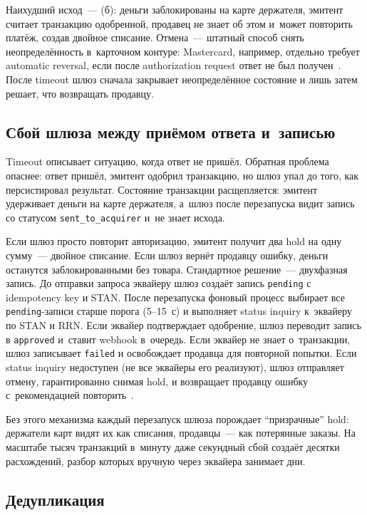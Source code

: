 Наихудший исход~--- (б): деньги заблокированы на карте
держателя, эмитент считает транзакцию одобренной, продавец
не знает об этом и~может повторить платёж, создав двойное списание.
Отмена~--- штатный способ снять неопределённость в~карточном
контуре: Mastercard, например, отдельно требует automatic reversal,
если после authorization request ответ не был получен~\cite{mc-tpr}.
После timeout шлюз сначала закрывает неопределённое состояние
и лишь затем решает, что возвращать продавцу.

\subsection*{Сбой шлюза между приёмом ответа и~записью}

Timeout описывает ситуацию, когда ответ не пришёл. Обратная
проблема опаснее: ответ пришёл, эмитент одобрил транзакцию,
но шлюз упал до того, как персистировал результат. Состояние
транзакции расщепляется: эмитент удерживает деньги на карте
держателя, а~шлюз после перезапуска видит запись со статусом
\texttt{sent\_to\_acquirer} и~не знает исхода.

Если шлюз просто повторит авторизацию, эмитент получит два
hold на одну сумму~--- двойное списание. Если шлюз вернёт
продавцу ошибку, деньги останутся заблокированными без
товара. Стандартное решение~--- двухфазная запись.
До отправки запроса эквайеру шлюз создаёт запись
\texttt{pending} с idempotency key и STAN. После перезапуска
фоновый процесс выбирает все \texttt{pending}-записи старше
порога (5--15~с) и выполняет status inquiry к~эквайеру по STAN
и RRN. Если эквайер подтверждает одобрение, шлюз переводит
запись в \texttt{approved} и~ставит webhook в~очередь. Если
эквайер не знает о~транзакции, шлюз записывает
\texttt{failed} и освобождает продавца для повторной попытки.
Если status inquiry недоступен (не все эквайеры его
реализуют), шлюз отправляет отмену, гарантированно
снимая hold, и возвращает продавцу ошибку с~рекомендацией
повторить~\cite{mc-tpr}.

Без этого механизма каждый перезапуск шлюза порождает
\enquote{призрачные} hold: держатели карт видят их как
списания, продавцы~--- как потерянные заказы. На масштабе
тысяч транзакций в~минуту даже секундный сбой создаёт десятки
расхождений, разбор которых вручную через эквайера занимает дни.

\subsection*{Дедупликация}

